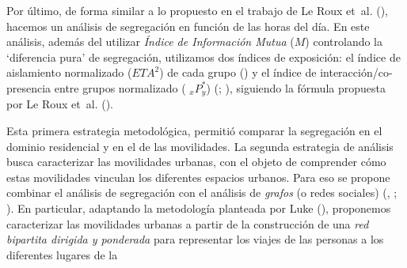 \documentclass[
  spanish,
  a4paper,%
  chapterprefix=true,%
  DIV=calc,%
  twoside]{scrbook}%
\begin{document}
Por último, de
forma similar a lo propuesto en el trabajo de Le Roux et~al. (), hacemos un
análisis de segregación en función de las horas del día. En este
análisis, además del utilizar \emph{Índice de Información Mutua} (\(M\))
controlando la `diferencia pura' de segregación, utilizamos dos índices
de exposición: el índice de aislamiento normalizado (\(ETA^2\)) de cada
grupo () y el índice de interacción/co-presencia entre grupos
normalizado ( \(_xP_{y}^*\)) (; ), siguiendo la fórmula
propuesta por Le Roux et~al. ().

Esta primera estrategia metodológica, permitió comparar la segregación
en el dominio residencial y en el de las movilidades. La segunda
estrategia de análisis busca caracterizar las movilidades urbanas, con
el objeto de comprender cómo estas movilidades vinculan los diferentes
espacios urbanos. Para eso
se propone combinar el análisis de segregación con el análisis de
\emph{grafos} (o redes sociales) (, ; ).
En particular, adaptando la metodología planteada por Luke (),
proponemos caracterizar las movilidades urbanas a partir de la
construcción de una \emph{red bipartita dirigida y ponderada} para
representar los viajes de las personas a los diferentes lugares de la
\end{document}
